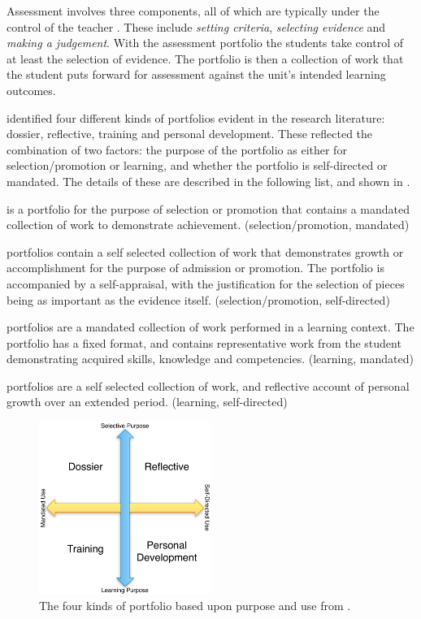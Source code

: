 Assessment involves three components, all of which are typically under the control of the teacher \cite{Biggs:1997}. These include \emph{setting criteria}, \emph{selecting evidence} and \emph{making a judgement}. With the assessment portfolio the students take control of at least the selection of evidence. The portfolio is then a collection of work that the student puts forward for assessment against the unit's intended learning outcomes.

\citet{Smith:2001,Smith:2003} identified four different kinds of portfolios evident in the research literature: dossier, reflective, training and personal development. These reflected the combination of two factors: the purpose of the portfolio as either for selection/promotion or learning, and whether the portfolio is self-directed or mandated. The details of these are described in the following list, and shown in .

\begin{description}
	\item[Dossier] is a portfolio for the purpose of selection or promotion that contains a mandated collection of work to demonstrate achievement. (selection/promotion, mandated)
	\item[Reflective] portfolios contain a self selected collection of work that demonstrates growth or accomplishment for the purpose of admission or promotion. The portfolio is accompanied by a self-appraisal, with the justification for the selection of pieces being as important as the evidence itself. (selection/promotion, self-directed)
	\item[Training] portfolios are a mandated collection of work performed in a learning context. The portfolio has a fixed format, and contains representative work from the student demonstrating acquired skills, knowledge and competencies. (learning, mandated)
	\item[Personal development] portfolios are a self selected collection of work, and reflective account of personal growth over an extended period. (learning, self-directed)
\end{description}

\begin{figure}[htbp]
	\centering
	\includegraphics[width=0.50\textwidth]{PortfolioTypes}
	\caption{The four kinds of portfolio based upon purpose and use from \citet{Smith:2001}.}
	\label{fig:portfolio_types}
\end{figure}

